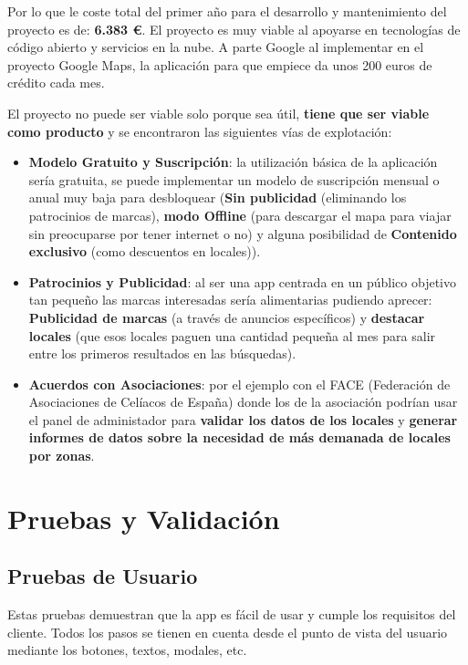 \documentclass[a4paper,11pt]{article}
\begin{document}
Por lo que le coste total del primer año para el desarrollo y mantenimiento del proyecto es de: \textbf{6.383 €}. El proyecto es muy viable al apoyarse en tecnologías de código abierto y servicios en la nube. A parte Google al implementar en el proyecto Google Maps, la aplicación para que empiece da unos 200 euros de crédito cada mes. 

El proyecto no puede ser viable solo porque sea útil, \textbf{tiene que ser viable como producto} y se encontraron las siguientes vías de explotación:
\begin{itemize}
    \item \textbf{Modelo Gratuito y Suscripción}: la utilización básica de la aplicación sería gratuita, se puede implementar un modelo de suscripción mensual o anual muy baja para desbloquear (\textbf{Sin publicidad} (eliminando los patrocinios de marcas), \textbf{modo Offline} (para descargar el mapa para viajar sin preocuparse por tener internet o no) y alguna posibilidad de \textbf{Contenido exclusivo} (como descuentos en locales)).
    \item \textbf{Patrocinios y Publicidad}: al ser una app centrada en un público objetivo tan pequeño las marcas interesadas sería alimentarias pudiendo aprecer: \textbf{Publicidad de marcas} (a través de anuncios específicos) y \textbf{destacar locales} (que esos locales paguen una cantidad pequeña al mes para salir entre los primeros resultados en las búsquedas).
    \item \textbf{Acuerdos con Asociaciones}: por el ejemplo con el FACE (Federación de Asociaciones de Celíacos de España) donde los de la asociación podrían usar el panel de administador para \textbf{validar los datos de los locales} y \textbf{generar informes de datos sobre la necesidad de más demanada de locales por zonas}.
\end{itemize}

\section{Pruebas y Validación}

\subsection{Pruebas de Usuario}

Estas pruebas demuestran que la app es fácil de usar y cumple los requisitos del cliente. Todos los pasos se tienen en cuenta desde el punto de vista del usuario mediante los botones, textos, modales, etc.
\end{document}
